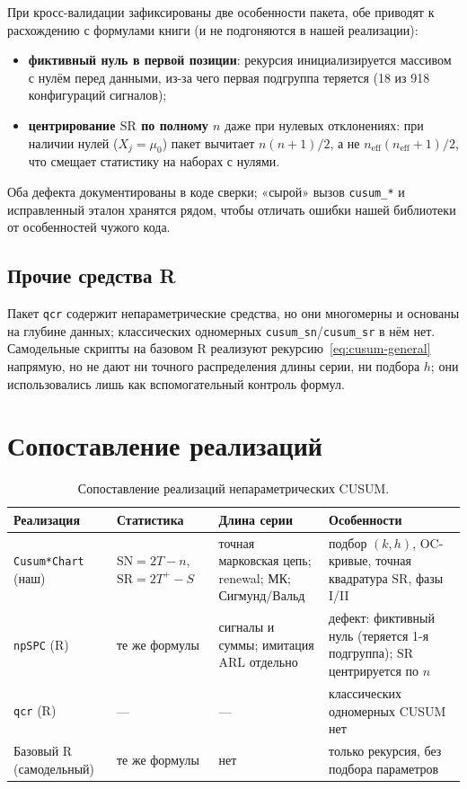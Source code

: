 \documentclass[11pt,a4paper]{article}
\newcommand{\SN}{\mathrm{SN}}
\newcommand{\SR}{\mathrm{SR}}
\newcommand{\ARL}{\mathrm{ARL}}
\begin{document}
При кросс-валидации зафиксированы две особенности пакета, обе приводят к
расхождению с формулами книги (и не подгоняются в нашей реализации):
\begin{itemize}
  \item \textbf{фиктивный нуль в первой позиции}: рекурсия
        инициализируется массивом с нулём перед данными, из-за чего
        первая подгруппа теряется (18 из 918 конфигураций сигналов);
  \item \textbf{центрирование $\SR$ по полному $n$} даже при нулевых
        отклонениях: при наличии нулей ($X_j=\mu_0$) пакет вычитает
        $n(n+1)/2$, а не $n_{\text{eff}}(n_{\text{eff}}+1)/2$, что
        смещает статистику на наборах с нулями.
\end{itemize}
Оба дефекта документированы в коде сверки; «сырой» вызов
\texttt{cusum\_*} и исправленный эталон хранятся рядом, чтобы отличать
ошибки нашей библиотеки от особенностей чужого кода.

\subsection{Прочие средства R}
\label{sec:r-other}

Пакет \texttt{qcr} содержит непараметрические средства, но они
многомерны и основаны на глубине данных; классических одномерных
\texttt{cusum\_sn}/\texttt{cusum\_sr} в нём нет. Самодельные скрипты на
базовом R реализуют рекурсию~\eqref{eq:cusum-general} напрямую, но не
дают ни точного распределения длины серии, ни подбора $h$; они
использовались лишь как вспомогательный контроль формул.

\section{Сопоставление реализаций}
\label{sec:compare}

\begin{table}[htbp]\centering
\caption{Сопоставление реализаций непараметрических CUSUM.}
\label{tab:compare}
\footnotesize
\begin{tabular}{@{}p{3.0cm} p{3.6cm} p{3.4cm} p{4.0cm}@{}}
\toprule
Реализация & Статистика & Длина серии & Особенности \\
\midrule
\texttt{Cusum*Chart} (наш) & $\SN=2T-n$, $\SR=2T^+-S$ &
точная марковская цепь; renewal; МК; Сигмунд/Вальд &
подбор $(k,h)$, OC-кривые, точная квадратура $\SR$, фазы I/II \\
\texttt{npSPC} (R) & те же формулы & сигналы и суммы;
имитация $\ARL$ отдельно &
дефект: фиктивный нуль (теряется 1-я подгруппа); $\SR$ центрируется по $n$ \\
\texttt{qcr} (R) & --- & --- & классических одномерных CUSUM нет \\
Базовый R (самодельный) & те же формулы & нет & только рекурсия, без подбора параметров \\
\bottomrule
\end{tabular}
\normalsize
\end{table}
\end{document}
